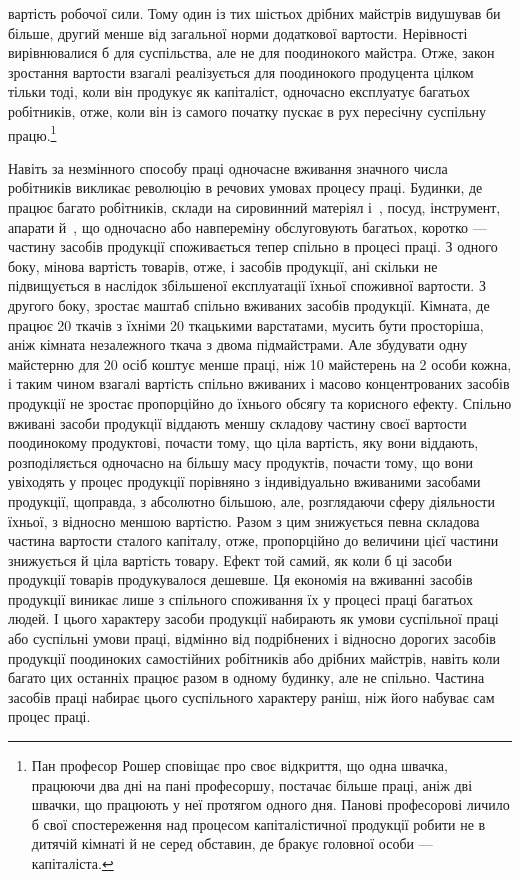 \parcont{}  %
вартість робочої сили. Тому один із тих шістьох дрібних майстрів
видушував би більше, другий менше від загальної норми додаткової
вартости. Нерівності вирівнювалися б для суспільства, але
не для поодинокого майстра. Отже, закон зростання вартости
взагалі реалізується для поодинокого продуцента цілком тільки
тоді, коли він продукує як капіталіст, одночасно експлуатує
багатьох робітників, отже, коли він із самого початку пускає в
рух пересічну суспільну працю.\footnote{
Пан професор Рошер сповіщає про своє відкриття, що одна швачка,
працюючи два дні на пані професоршу, постачає більше праці, аніж дві
швачки, що працюють у неї протягом одного дня. Панові професорові
личило б свої спостереження над процесом капіталістичної продукції
робити не в дитячій кімнаті й не серед обставин, де бракує головної особи —
капіталіста.
}

Навіть за незмінного способу праці одночасне вживання
значного числа робітників викликає революцію в речових умовах
процесу праці. Будинки, де працює багато робітників, склади
на сировинний матеріял і~, посуд, інструмент, апарати й~,
що одночасно або навпереміну обслуговують багатьох, коротко —
частину засобів продукції споживається тепер спільно в процесі
праці. З одного боку, мінова вартість товарів, отже, і засобів
продукції, ані скільки не підвищується в наслідок збільшеної
експлуатації їхньої споживної вартости. З другого боку,
зростає маштаб спільно вживаних засобів продукції. Кімната,
де працює 20 ткачів з їхніми 20 ткацькими варстатами, мусить
бути просторіша, аніж кімната незалежного ткача з двома підмайстрами.
Але збудувати одну майстерню для 20 осіб коштує
менше праці, ніж 10 майстерень на 2 особи кожна, і таким чином
взагалі вартість спільно вживаних і масово концентрованих засобів
продукції не зростає пропорційно до їхнього обсягу та корисного
ефекту. Спільно вживані засоби продукції віддають меншу
складову частину своєї вартости поодинокому продуктові, почасти
тому, що ціла вартість, яку вони віддають, розподіляється
одночасно на більшу масу продуктів, почасти тому, що вони увіходять
у процес продукції порівняно з індивідуально вживаними
засобами продукції, щоправда, з абсолютно більшою, але, розглядаючи
сферу діяльности їхньої, з відносно меншою вартістю.
Разом з цим знижується певна складова частина вартости сталого
капіталу, отже, пропорційно до величини цієї частини знижується
й ціла вартість товару. Ефект той самий, як коли б ці засоби
продукції товарів продукувалося дешевше. Ця економія на вживанні
засобів продукції виникає лише з спільного споживання
їх у процесі праці багатьох людей. І цього характеру засоби продукції
набирають як умови суспільної праці або суспільні умови
праці, відмінно від подрібнених і відносно дорогих засобів продукції
поодиноких самостійних робітників або дрібних майстрів,
навіть коли багато цих останніх працює разом в одному будинку,
але не спільно. Частина засобів праці набирає цього суспільного
характеру раніш, ніж його набуває сам процес праці.
